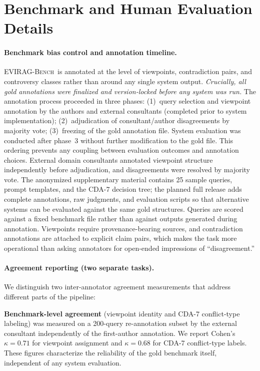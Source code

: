 \documentclass[11pt]{article}
\newcommand{\bench}{\textsc{EVIRAG-Bench}\xspace}
\begin{document}
\section{Benchmark and Human Evaluation Details}
\label{app:protocol}

\paragraph{Benchmark bias control and annotation timeline.}
\bench\ is annotated at the level of viewpoints, contradiction pairs, and
controversy classes rather than around any single system output.
\emph{Crucially, all gold annotations were finalized and version-locked before
any system was run.}  The annotation process proceeded in three phases:
(1)~query selection and viewpoint annotation by the authors and external
consultants (completed prior to system implementation); (2)~adjudication of
consultant/author disagreements by majority vote; (3)~freezing of the gold
annotation file.  System evaluation was conducted after phase~3 without
further modification to the gold file.  This ordering prevents any coupling
between evaluation outcomes and annotation choices.
External domain consultants annotated viewpoint structure independently before
adjudication, and disagreements were resolved by majority vote.  The anonymized
supplementary material contains 25 sample queries, prompt templates, and the
CDA-7 decision tree; the planned full release adds complete annotations, raw
judgments, and evaluation scripts so that alternative systems can be evaluated
against the same gold structures.  Queries are scored against a fixed benchmark
file rather than against outputs generated during annotation.
Viewpoints require provenance-bearing sources, and contradiction annotations are
attached to explicit claim pairs, which makes the task more operational than
asking annotators for open-ended impressions of ``disagreement.''

\paragraph{Agreement reporting (two separate tasks).}
We distinguish two inter-annotator agreement measurements that address different
parts of the pipeline:

\textbf{Benchmark-level agreement} (viewpoint identity and CDA-7 conflict-type
labeling) was measured on a 200-query re-annotation subset by the external
consultant independently of the first-author annotation.  We report
Cohen's $\kappa{=}0.71$ for viewpoint assignment and $\kappa{=}0.68$ for
CDA-7 conflict-type labels.  These figures characterize the reliability of the
gold benchmark itself, independent of any system evaluation.
\end{document}

